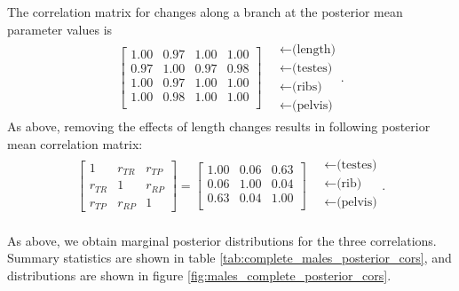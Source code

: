 \documentclass[12pt]{article}
\begin{document}
The correlation matrix for changes along a branch at the posterior mean parameter values is 
\begin{align}
\begin{bmatrix}
   1.00 & 0.97 & 1.00 & 1.00 \\ 
   0.97 & 1.00 & 0.97 & 0.98 \\ 
   1.00 & 0.97 & 1.00 & 1.00 \\ 
   1.00 & 0.98 & 1.00 & 1.00 \\ 
 \end{bmatrix}
\quad \begin{matrix}
  \leftarrow \text{(length)} \\
  \leftarrow \text{(testes)} \\
  \leftarrow \text{(ribs)} \\
  \leftarrow \text{(pelvis)} 
\end{matrix} .
\end{align}
As above, removing the effects of length changes results in following posterior mean correlation matrix:
\begin{align}
\begin{bmatrix}
  1 & r_{TR} & r_{TP} \\ 
  r_{TR} & 1 & r_{RP} \\ 
  r_{TP} & r_{RP} & 1 
 \end{bmatrix}
 =
\begin{bmatrix}
   1.00 & 0.06 & 0.63 \\ 
   0.06 & 1.00 & 0.04 \\ 
   0.63 & 0.04 & 1.00 \\ 
 \end{bmatrix}
\quad \begin{matrix}
  \leftarrow \text{(testes)} \\
  \leftarrow \text{(rib)} \\
  \leftarrow \text{(pelvis)} \\
\end{matrix}  .
\end{align}

As above, we obtain marginal posterior distributions for the three correlations.
Summary statistics are shown in table \ref{tab:complete_males_posterior_cors},
and distributions are shown in figure \ref{fig:males_complete_posterior_cors}.
\end{document}
